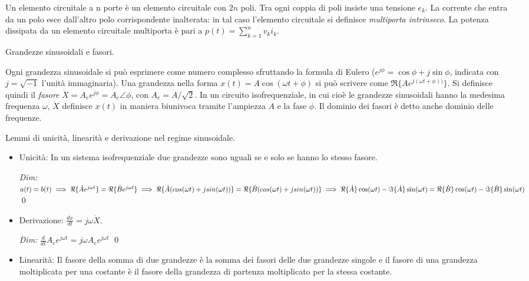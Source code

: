 \documentclass[answers, a4paper,12pt]{exam}
\begin{document}
\begin{questions}
\begin{solution}
		Un elemento circuitale a n porte è un elemento circuitale con $2n$ poli. Tra ogni coppia di poli insiste una tensione $e_k$. La corrente che entra da un polo esce dall'altro polo corrispondente inalterata: in tal caso l'elemento circuitale si definisce \textit{multiporta intrinseco}. La potenza dissipata da un elemento circuitale multiporta è pari a $p(t) = \sum\limits_{k = 1}^n v_k i_k$.
	\end{solution}
	\question
	Grandezze sinusoidali e fasori.
	\begin{solution}
		Ogni grandezza sinusoidale si può esprimere come numero complesso sfruttando la formula di Eulero ($e^{j\phi} = \cos \phi + j \sin \phi$, indicata con $j = \sqrt{-1}$ l'unità immaginaria). Una grandezza nella forma $x(t) = A \cos(\omega t + \phi)$ si può scrivere come $\Re \{Ae^{j(\omega t + \phi))}\}$. Si definisce quindi il \textit{fasore} $\dot{X} = A_e e^{j\phi} = A_e \angle \phi$, con $A_e = A / \sqrt{2}$. In un circuito isofrequenziale, in cui cioè le grandezze sinusoidali hanno la medesima frequenza $\omega$, $\dot{X}$ definisce $x(t)$ in maniera biunivoca tramite l'ampiezza $A$ e la fase $\phi$. Il dominio dei fasori è detto anche dominio delle frequenze. 
	\end{solution}
	\question
	Lemmi di unicità, linearità e derivazione nel regime sinusoidale.
	\begin{solution}
		\begin{itemize}
			\item Unicità: In un sistema isofrequenziale due grandezze sono uguali se e solo se hanno lo stesso fasore. 
			
			\textit{Dim:} $a(t) = b(t) \\
			\implies
			\Re\{\dot{A} e^{j \omega t}\} = \Re\{\dot{B}e^{j\omega t}\} \\ \implies
			\Re\{\dot{A} (cos (\omega t) + j sin (\omega t))\} = \Re\{\dot{B}(cos (\omega t) + j sin (\omega t))\}
			\\ \implies
			\Re\{\dot{A}\} \cos(\omega t) - \Im\{\dot{A}\}\sin(\omega t) = \Re\{\dot{B}\} \cos(\omega t) - \Im\{\dot{B}\}\sin(\omega t)
			$ \qed
			\item 
			Derivazione: $\frac{dx}{dt} = j \omega \dot{X}$. 
			
			\textit{Dim:} $\frac{d}{dt} A_e e^{j \omega t} = j \omega A_e e^{j \omega t}$ \qed
			\item 
			Linearità: Il fasore della somma di due grandezze è la somma dei fasori delle due grandezze singole e il fasore di una grandezza moltiplicata per una costante è il fasore della grandezza di partenza moltiplicato per la stessa costante. 
			

\end{itemize}
\end{solution}
\end{questions}
\end{document}

